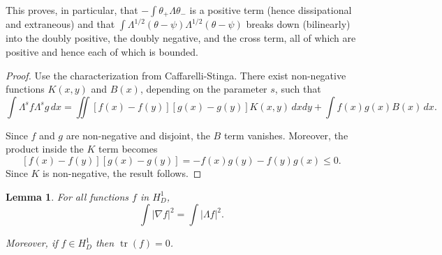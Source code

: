 \documentclass[11pt]{amsart}
\newtheorem{lemma}[theorem]{Lemma}
\theoremstyle{remark}
\theoremstyle{definition}
\newcommand{\abs}[1]{\left\lvert #1 \right\rvert}
\DeclareMathOperator{\trace}{tr}
\newcommand{\grad}{\nabla}
\begin{document}
This proves, in particular, that $-\int \theta_+ \Lambda \theta_-$ is a positive term (hence dissipational and extraneous) and that $\int \Lambda^{1/2} (\theta-\psi) \Lambda^{1/2} (\theta-\psi)$ breaks down (bilinearly) into the doubly positive, the doubly negative, and the cross term, all of which are positive and hence each of which is bounded.  

\begin{proof}
Use the characterization from Caffarelli-Stinga.  There exist non-negative functions $K(x,y)$ and $B(x)$, depending on the parameter $s$, such that
\[ \int \Lambda^s f \Lambda^s g \,dx = \iint [f(x)-f(y)][g(x)-g(y)] K(x,y) \,dxdy + \int f(x) g(x) B(x) \,dx. \]

Since $f$ and $g$ are non-negative and disjoint, the $B$ term vanishes.  Moreover, the product inside the $K$ term becomes
\[ [f(x)-f(y)][g(x)-g(y)] = -f(x)g(y)-f(y)g(x) \leq 0. \]
Since $K$ is non-negative, the result follows.  
\end{proof}

\begin{lemma}
For all functions $f$ in $H_D^1$,
\[ \int \abs{\grad f}^2 = \int \abs{\Lambda f}^2. \]

Moreover, if $f \in H_D^1$ then $\trace(f)=0$.  
\end{lemma}
\end{document}
